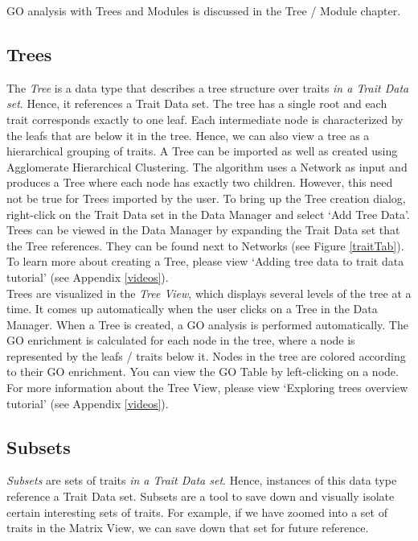 \documentclass{article}
\begin{document}
GO analysis with Trees and Modules is discussed in the Tree / Module chapter.

\subsection{Trees}

The {\it Tree} is a data type that describes a tree structure over traits {\it in a Trait Data set}. Hence, it references a Trait Data set. The tree has a single root and each trait corresponds exactly to one leaf. Each intermediate node is characterized by the leafs that are below it in the tree. Hence, we can also view a tree as a hierarchical grouping of traits. A Tree can be imported as well as created using Agglomerate Hierarchical Clustering. The algorithm uses a Network as input and produces a Tree where each node has exactly two children. However, this need not be true for Trees imported by the user. To bring up the Tree creation dialog, right-click on the Trait Data set in the Data Manager and select `Add Tree Data'. Trees can be viewed in the Data Manager by expanding the Trait Data set that the Tree references. They can be found next to Networks (see Figure \ref{traitTab}). To learn more about creating a Tree, please view `Adding tree data to trait data tutorial' (see Appendix \ref{videos}).\\

Trees are visualized in the {\it Tree View}, which displays several levels of the tree at a time. It comes up automatically when the user clicks on a Tree in the Data Manager. When a Tree is created, a GO analysis is performed automatically. The GO enrichment is calculated for each node in the tree, where a node is represented by the leafs / traits below it. Nodes in the tree are colored according to their GO enrichment. You can view the GO Table by left-clicking on a node. For more information about the Tree View, please view `Exploring trees overview tutorial' (see Appendix \ref{videos}).

\subsection{Subsets}

{\it Subsets} are sets of traits {\it in a Trait Data set}. Hence, instances of this data type reference a Trait Data set. Subsets are a tool to save down and visually isolate certain interesting sets of traits. For example, if we have zoomed into a set of traits in the Matrix View, we can save down that set for future reference. \\
\end{document}
